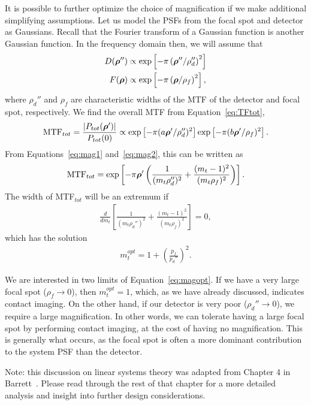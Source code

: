 \documentclass[mphy386-notes.tex]{subfiles}
\begin{document}
It is possible to further optimize the choice of magnification if we make additional simplifying
assumptions.  Let us model the PSFs from the focal spot and detector as Gaussians. Recall that the Fourier transform of a
Gaussian function is another Gaussian function. In the frequency domain then, we
will assume that
\begin{align}
  D(\boldsymbol{\rho}'') &\propto \text{exp}\left[-\pi\left(\boldsymbol{\rho}''/\rho_d''\right)^2\right]\\
  F(\boldsymbol{\rho}) &\propto \text{exp}\left[-\pi\left(\boldsymbol{\rho}/\rho_f\right)^2\right],
\end{align}
where $\rho_d''$ and $\rho_f$ are characteristic widths of the MTF of the detector and
focal spot, respectively. We find the overall MTF from Equation~\ref{eq:TFtot},
\begin{align}
  \text{MTF}_{tot} = \frac{|P_{tot}(\boldsymbol{\rho}')|}{P_{tot}(0)} \propto \text{exp}\left[-\pi(a\boldsymbol{\rho}'/\rho_d'')^2\right]\text{exp}\left[-\pi(b\boldsymbol{\rho}'/\rho_f)^2\right].
\end{align}
From Equations~\ref{eq:mag1} and~\ref{eq:mag2}, this can be written as
\begin{align}
  \text{MTF}_{tot} = \text{exp}\left[-\pi\boldsymbol{\rho}'\left(\frac{1}{(m_t \rho_d'')^2} + \frac{(m_t-1)^2}{(m_t\rho_f)^2}\right)\right].
\end{align}
The width of MTF$_{tot}$ will be an extremum if
\begin{align}
  \frac{d}{d m_t}\left[\frac{1}{(m_t \rho_d'')^2} + \frac{(m_t-1)^2}{(m_t\rho_f)^2}\right] = 0,
\end{align}
which has the solution
 \begin{align}
  m_t^{opt} = 1 + \left(\frac{p_f}{p_d''}\right)^2.
  \label{eq:magopt}
\end{align}

We are interested in two limits of Equation~\ref{eq:magopt}. If we have a very
large focal spot ($\rho_f \to 0$), then $m_t^{opt} = 1$, which, as we have already
discussed, indicates contact imaging. On the other hand, if our detector is very
poor ($\rho_d'' \to 0$), we require a large magnification. In other words, we can
tolerate having a large focal spot by performing contact imaging, at the cost of
having no magnification. This is generally what occurs, as the focal spot is
often a more dominant contribution to the system PSF than the detector.

Note: this discussion on linear systems theory was adapted from Chapter 4 in
Barrett~\cite{barrett}. Please read through the rest of that chapter for a more
detailed analysis and insight into further design considerations. 

\pagebreak
\end{document}
